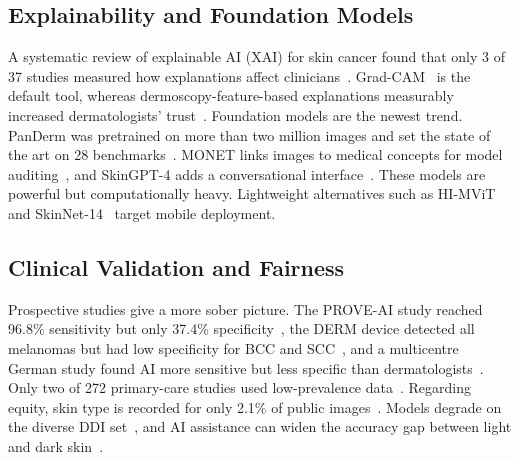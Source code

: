 \subsection{Explainability and Foundation Models}
A systematic review of explainable AI (XAI) for skin cancer found that
only 3 of 37 studies measured how explanations affect
clinicians~\cite{hauser2022}. Grad-CAM~\cite{selvaraju2017gradcam} is
the default tool, whereas dermoscopy-feature-based explanations
measurably increased dermatologists' trust~\cite{chanda2024}.
Foundation models are the newest trend. PanDerm was pretrained on more
than two million images and set the state of the art on 28
benchmarks~\cite{yan2025panderm}. MONET links images to medical
concepts for model auditing~\cite{kim2024monet}, and SkinGPT-4 adds a
conversational interface~\cite{zhou2024skingpt4}. These models are
powerful but computationally heavy. Lightweight alternatives such as
HI-MViT~\cite{ding2023} and SkinNet-14~\cite{almahmud2024} target
mobile deployment.

\subsection{Clinical Validation and Fairness}
Prospective studies give a more sober picture. The PROVE-AI study
reached 96.8\% sensitivity but only 37.4\% specificity~\cite{marchetti2023},
the DERM device detected all melanomas but had low specificity for
BCC and SCC~\cite{marsden2023}, and a multicentre German study found AI
more sensitive but less specific than dermatologists~\cite{heinlein2024}.
Only two of 272 primary-care studies used low-prevalence
data~\cite{jones2022}. Regarding equity, skin type is recorded for only
2.1\% of public images~\cite{wen2022}. Models degrade on the diverse DDI
set~\cite{daneshjou2022ddi}, and AI assistance can widen the accuracy
gap between light and dark skin~\cite{groh2024}.

